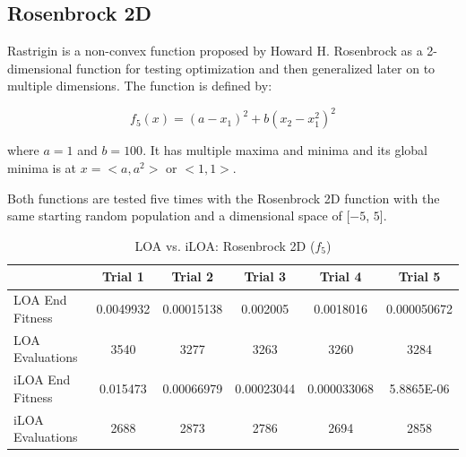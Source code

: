 \subsection{Rosenbrock 2D}

\par Rastrigin is a non-convex function proposed by Howard H. Rosenbrock as a 2-dimensional function for testing optimization and then generalized later on to multiple dimensions. The function is defined by:

$$
f_5(x) = (a-x_1)^2+b(x_2-x_1^2)^2
$$

where $a=1$ and $b=100$. It has multiple maxima and minima and its global minima is at $x=<a,a^2>$ or $<1,1>$.

\par Both functions are tested five times with the Rosenbrock 2D function with the same starting random population and a dimensional space of [$-5$, $5$].

\begin{table}[ht]
\scriptsize
\begin{tabular}{l|ccccc}
\textbf{}        & \textbf{Trial 1} & \textbf{Trial 2} & \textbf{Trial 3} & \textbf{Trial 4} & \textbf{Trial 5} \\
\hline
LOA End Fitness  & 0.0049932        & 0.00015138       & 0.002005         & 0.0018016        & 0.000050672          \\
LOA Evaluations  & 3540             & 3277             & 3263             & 3260             & 3284             \\
iLOA End Fitness & 0.015473         & 0.00066979       & 0.00023044       & 0.000033068      & 5.8865E-06       \\
iLOA Evaluations & 2688             & 2873             & 2786             & 2694             & 2858
\end{tabular}
\caption{ \scriptsize LOA vs. iLOA: Rosenbrock 2D ($f_5$)}
\end{table}

